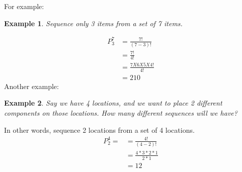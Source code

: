 \documentclass[../IND E 315.tex]{subfiles}
\newtheorem{exmp}{Example}
\begin{document}
For example:
\begin{exmp}
    Sequence only 3 items from a set of 7 items.
\end{exmp}
\begin{equation*}
    \begin{aligned}
        P^7_3 &= \frac{7!}{(7-3)!} \\
                &= \frac{7!}{4!} \\
                &= \frac{7X6X5X4!}{4!} \\
                &= 210
    \end{aligned}
\end{equation*}
Another example:
\begin{exmp}
    Say we have 4 locations, and we want to place 2 different components on those locations. How many different sequences will we have?
\end{exmp}
In other words, sequence 2 locations from a set of 4 locations.
\begin{equation*}
    \begin{aligned}
        P^4_2 = &= \frac{4!}{(4-2)!} \\
                &= \frac{4*3*2*1}{2*1} \\
                &= 12
    \end{aligned}
\end{equation*}

\end{document}
